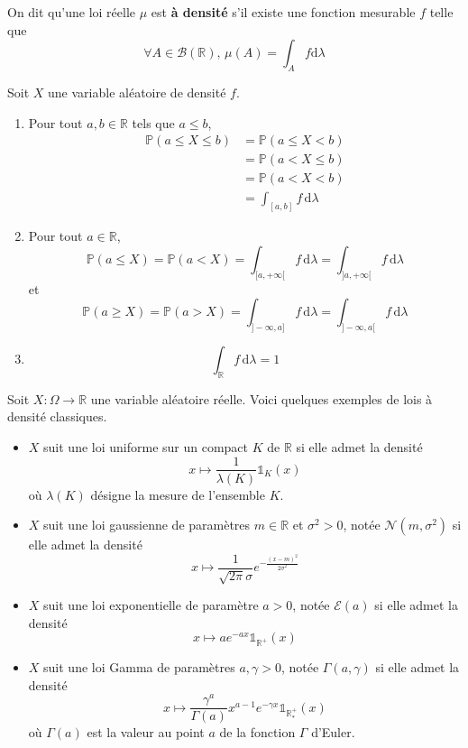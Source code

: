   \begin{definition}
    On dit qu'une loi réelle $\mu$ est \textbf{à densité} s'il existe une fonction mesurable $f$ telle que
    \[ \forall A \in \mathcal{B}(\mathbb{R}), \, \mu(A) = \int_A f \mathrm{d}\lambda \]
  \end{definition}

  \begin{proposition}
    Soit $X$ une variable aléatoire de densité $f$.
    \begin{enumerate}[label={\bfseries(\roman*)}]
      \item Pour tout $a, b \in \mathbb{R}$ tels que $a \leq b$,
      \begin{align*}
        \mathbb{P}(a \leq X \leq b) &= \mathbb{P}(a \leq X < b) \\
        &= \mathbb{P}(a < X \leq b) \\
        &= \mathbb{P}(a < X < b) \\
        &= \int_{[a,b]} f \, \mathrm{d}\lambda
      \end{align*}
      \item Pour tout $a \in \mathbb{R}$,
      \[ \mathbb{P}(a \leq X) = \mathbb{P}(a < X) = \int_{[a,+\infty[} f \, \mathrm{d}\lambda = \int_{]a,+\infty[} f \, \mathrm{d}\lambda \]
      et
      \[ \mathbb{P}(a \geq X) = \mathbb{P}(a > X) = \int_{]-\infty, a]} f \, \mathrm{d}\lambda = \int_{]-\infty, a[} f \, \mathrm{d}\lambda \]
      \item \[ \int_{\mathbb{R}} f \, \mathrm{d}\lambda = 1 \]
    \end{enumerate}
  \end{proposition}


  \begin{example}
    Soit $X : \Omega \rightarrow \mathbb{R}$ une variable aléatoire réelle. Voici quelques exemples de lois à densité classiques.
    \begin{itemize}
      \item $X$ suit une loi uniforme sur un compact $K$ de $\mathbb{R}$ si elle admet la densité
      \[ x \mapsto \frac{1}{\lambda(K)} \mathbb{1}_K(x) \]
      où $\lambda(K)$ désigne la mesure de l'ensemble $K$.
      \item $X$ suit une loi gaussienne de paramètres $m \in \mathbb{R}$ et $\sigma^2 > 0$, notée $\mathcal{N}(m, \sigma^2)$ si elle admet la densité
      \[ x \mapsto \frac{1}{\sqrt{2\pi}\sigma} e^{-\frac{(x-m)^2}{2\sigma^2}} \]
      \item $X$ suit une loi exponentielle de paramètre $a > 0$, notée $\mathcal{E}(a)$ si elle admet la densité
      \[ x \mapsto a e^{-ax} \mathbb{1}_{\mathbb{R}^+}(x) \]
      \item $X$ suit une loi Gamma de paramètres $a, \gamma > 0$, notée $\Gamma(a, \gamma)$ si elle admet la densité
      \[ x \mapsto \frac{\gamma^a}{\Gamma(a)} x^{a-1} e^{-\gamma x} \mathbb{1}_{\mathbb{R}^+_*}(x) \]
      où $\Gamma(a)$ est la valeur au point $a$ de la fonction $\Gamma$ d'Euler.
    \end{itemize}
  \end{example}

